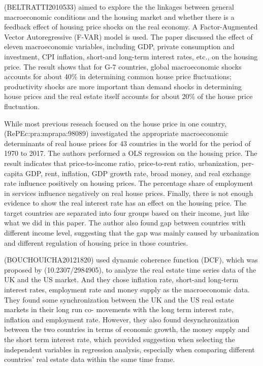 \documentclass[11pt]{article}
\begin{document}
(BELTRATTI2010533) aimed to explore the the linkages between general macroeconomic conditions and the housing market and whether there is a feedback effect of housing price shocks on the real economy. A Factor-Augmented Vector Autoregressive (F-VAR) model is used. The paper discussed the effect of eleven macroeconomic variables, including GDP, private consumption and investment, CPI inflation, short-and long-term interest rates, etc., on the housing price. The result shows that for G-7 countries, global macroeconomic shocks accounts for about 40\% in determining common house price fluctuations; productivity shocks are more important than demand shocks in determining house prices and the real estate itself accounts for about 20\% of the house price fluctuation.

While most previous reseach focused on the house price in one country, (RePEc:pra:mprapa:98089) investigated the appropriate macroeconomic determinants of real house prices for 43 countries in the world for the period of 1970 to 2017. The authors performed a OLS regression on the housing price. The result indicates that price-to-income ratio, price-to-rent ratio, urbanization, per-capita GDP, rent, inflation, GDP growth rate, broad money, and real exchange rate influence positively on housing prices. The percentage share of employment in services influence negatively on real house prices. Finally, there is not enough evidence to show the real interest rate has an effect on the housing price. The target countries are separated into four groups based on their income, just like what we did in this paper. The author also found gap between countries with different income level, suggesting that the gap was mainly caused by urbanization and different regulation of housing price in those countries.

(BOUCHOUICHA20121820) used dynamic coherence function (DCF), which was proposed by (10.2307/2984905), to analyze the real estate time series data of the UK and the US market. And they chose inflation rate, short-and long-term interest rates, employment rate and money supply as the macroeconomic data. They found some synchronization between the UK and the US real estate markets in their long run co- movements with the long term interest rate, inflation and employment rate. However, they also found desynchronization between the two countries in terms of economic growth, the money supply and the short term interest rate, which provided suggestion when selecting the independent variables in regression analysis, especially when comparing different countries' real estate data within the same time frame.
\end{document}
